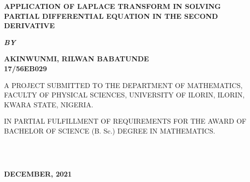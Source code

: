 \documentclass[11pt]{report}
\newcommand{\bt}[1]{\textbf{#1}}
\begin{document}
	\clearpage
	\thispagestyle{empty}
	\begin{center}
		\Large \bt{APPLICATION OF LAPLACE TRANSFORM IN SOLVING PARTIAL DIFFERENTIAL EQUATION IN THE SECOND DERIVATIVE}
	\end{center}
	
	\hspace{7cm}
	
	\begin{center}
		\textbf{\textit{BY}}
	\end{center}
	
	\hspace{5cm}
	
	\begin{center}
		\large \textbf{AKINWUNMI, RILWAN BABATUNDE 
			\\
			17/56EB029}
	\end{center}
	
	\hspace{9cm}
	
	\begin{center}
		A PROJECT SUBMITTED TO THE DEPARTMENT OF MATHEMATICS, FACULTY OF PHYSICAL SCIENCES, UNIVERSITY OF ILORIN, ILORIN, KWARA STATE, NIGERIA.
	\end{center}
	
	\hspace{7cm}
	
	\begin{center}
		IN PARTIAL FULFILLMENT OF REQUIREMENTS FOR THE AWARD OF BACHELOR OF SCIENCE (B. Sc.) DEGREE IN MATHEMATICS.
	\end{center}
	\hspace{5cm}
	\\ \\ 
	\begin{center}
		\textbf{DECEMBER, 2021}
	\end{center}
	
	\newpage
\end{document}
